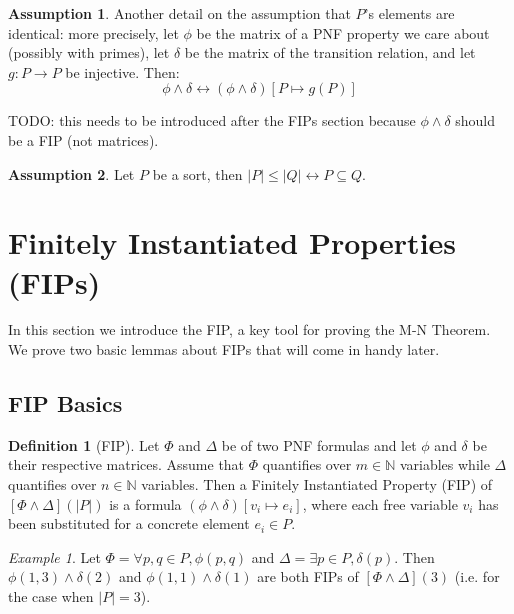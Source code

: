 \documentclass[12pt]{article}
\theoremstyle{definition}
\newtheorem{assumption}{Assumption}
\newtheorem{definition}{Definition}
\theoremstyle{remark}
\newtheorem{example}{Example}
\begin{document}
\begin{assumption}
  \label{asmp:perm}
  Another detail on the assumption that $P$'s elements are identical: more precisely, let $\phi$ be the matrix of a PNF property we care about (possibly with primes), let $\delta$ be the matrix of the transition relation, and let $g : P \to P$ be injective.  Then:
  $$\phi \land \delta \leftrightarrow (\phi \land \delta)[P \mapsto g(P)]$$

  TODO: this needs to be introduced after the FIPs section because $\phi\land\delta$ should be a FIP (not matrices).

\end{assumption}

\begin{assumption}
  \label{asmp:monot-card}
  Let $P$ be a sort, then $|P| \leq |Q| \leftrightarrow P \subseteq Q$.  
\end{assumption}


\section{Finitely Instantiated Properties (FIPs)}
In this section we introduce the FIP, a key tool for proving the M-N Theorem.  We prove two basic lemmas about FIPs that will come in handy later.

\subsection{FIP Basics}

\begin{definition}[FIP]
  Let $\Phi$ and $\Delta$ be of two PNF formulas and let $\phi$ and $\delta$ be their respective matrices.  Assume that $\Phi$ quantifies over $m \in \mathbb{N}$ variables while $\Delta$ quantifies over $n \in \mathbb{N}$ variables.  Then a Finitely Instantiated Property (FIP) of $[\Phi\land\Delta](|P|)$ is a formula $(\phi \land \delta) [v_i \mapsto e_i]$, where each free variable $v_i$ has been substituted for a concrete element $e_i \in P$.  
\end{definition}

\begin{example}
  Let $\Phi = \forall p,q \in P, \phi(p,q)$ and $\Delta = \exists p \in P, \delta(p)$.  Then $\phi(1,3)\land\delta(2)$ and $\phi(1,1)\land\delta(1)$ are both FIPs of $[\Phi\land\Delta](3)$ (i.e. for the case when $|P|=3$).
\end{example}
\end{document}
